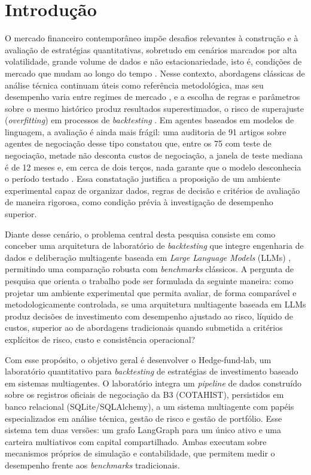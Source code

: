 \chapter{Introdução}
\label{cha:introducao}

O mercado financeiro contemporâneo impõe desafios relevantes à construção e à avaliação de estratégias quantitativas, sobretudo em cenários marcados por alta volatilidade, grande volume de dados e não estacionariedade, isto é, condições de mercado que mudam ao longo do tempo \citep{Lo2004}. Nesse contexto, abordagens clássicas de análise técnica continuam úteis como referência metodológica, mas seu desempenho varia entre regimes de mercado \citep{Lo2004}, e a escolha de regras e parâmetros sobre o mesmo histórico produz resultados superestimados, o risco de superajuste (\textit{overfitting}) em processos de \textit{backtesting} \citep{White2000, Bailey2017}. Em agentes baseados em modelos de linguagem, a avaliação é ainda mais frágil: uma auditoria de 91 artigos sobre agentes de negociação desse tipo constatou que, entre os 75 com teste de negociação, metade não desconta custos de negociação, a janela de teste mediana é de 12 meses e, em cerca de dois terços, nada garante que o modelo desconhecia o período testado \citep{Zhang2026}. Essa constatação justifica a proposição de um ambiente experimental capaz de organizar dados, regras de decisão e critérios de avaliação de maneira rigorosa, como condição prévia à investigação de desempenho superior.

Diante desse cenário, o problema central desta pesquisa consiste em como conceber uma arquitetura de laboratório de \textit{backtesting} que integre engenharia de dados e deliberação multiagente baseada em \textit{Large Language Models} (LLMs) \citep{TradingAgents2024, Xia2026}, permitindo uma comparação robusta com \textit{benchmarks} clássicos. A pergunta de pesquisa que orienta o trabalho pode ser formulada da seguinte maneira: como projetar um ambiente experimental que permita avaliar, de forma comparável e metodologicamente controlada, se uma arquitetura multiagente baseada em LLMs produz decisões de investimento com desempenho ajustado ao risco, líquido de custos, superior ao de abordagens tradicionais quando submetida a critérios explícitos de risco, custo e consistência operacional?

Com esse propósito, o objetivo geral é desenvolver o Hedge-fund-lab, um laboratório quantitativo para \textit{backtesting} de estratégias de investimento baseado em sistemas multiagentes. O laboratório integra um \textit{pipeline} de dados construído sobre os registros oficiais de negociação da B3 (COTAHIST), persistidos em banco relacional (SQLite/SQLAlchemy), a um sistema multiagente com papéis especializados em análise técnica, gestão de risco e gestão de portfólio. Esse sistema tem duas versões: um grafo LangGraph para um único ativo e uma carteira multiativos com capital compartilhado. Ambas executam sobre mecanismos próprios de simulação e contabilidade, que permitem medir o desempenho frente aos \textit{benchmarks} tradicionais.

